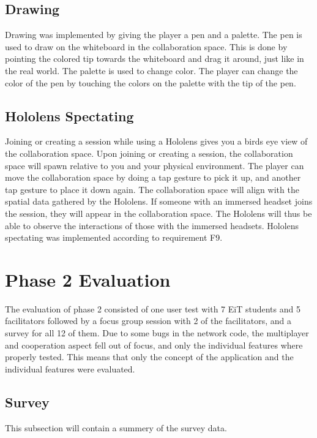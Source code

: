         \subsection{Drawing}
        Drawing was implemented by giving the player a pen and a palette. The pen is used to draw on the whiteboard in the collaboration space. This is done by pointing the colored tip towards the whiteboard and drag it around, just like in the real world. The palette is used to change color. The player can change the color of the pen by touching the colors on the palette with the tip of the pen.  %
        
        \subsection{Hololens Spectating}
        Joining or creating a session while using a Hololens gives you a birds eye view of the collaboration space. Upon joining or creating a session, the collaboration space will spawn relative to you and your physical environment. The player can move the collaboration space by doing a tap gesture to pick it up, and another tap gesture to place it down again. The collaboration space will align with the spatial data gathered by the Hololens. If someone with an immersed headset joins the session, they will appear in the collaboration space. The Hololens will thus be able to observe the interactions of those with the immersed headsets. Hololens spectating was implemented according to requirement F9.
    
    \section{Phase 2 Evaluation}
    The evaluation of phase 2 consisted of one user test with 7 EiT students and 5 facilitators followed by a focus group session with 2 of the facilitators, and a survey for all 12 of them.
    Due to some bugs in the network code, the multiplayer and cooperation aspect fell out of focus, and only the individual features where properly tested. This means that only the concept of the application and the individual features were evaluated.
    
    
        \subsection{Survey} %
        This subsection will contain a summery of the survey data.
        
